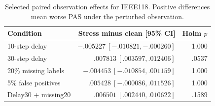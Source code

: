 \begin{table}[!htbp]
\centering\scriptsize
\setlength{\tabcolsep}{3pt}
\caption{Selected paired observation effects for IEEE118. Positive differences mean worse PAS under the perturbed observation.}
\label{tab:observation}
\begin{tabular}{lrr}
\toprule
Condition & Stress minus clean [95\% CI] & Holm $p$\\
\midrule
10-step delay & $-.005227\ [-.010821,-.000260]$ & 1.000\\
30-step delay & $.007813\ [.003597,.012406]$ & .0537\\
20\% missing labels & $-.004453\ [-.010854,.001159]$ & 1.000\\
5\% false positives & $.005428\ [-.000086,.011526]$ & 1.000\\
Delay30 + missing20 & $.006501\ [.002440,.010622]$ & .1589\\
\bottomrule
\end{tabular}
\end{table}
